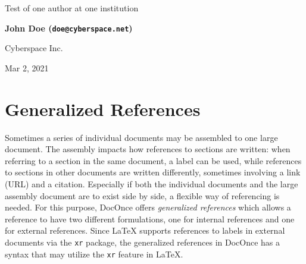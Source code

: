 \documentclass[%
oneside,                 %
final,                   %
chapterprefix=true,      %
open=right,              %
10pt]{book}
\begin{document}

\newcommand{\exercisesection}[1]{\subsection*{#1}}








\thispagestyle{empty}

\begin{center}
{\LARGE\bf
\begin{spacing}{1.25}
Test of one author at one institution
\end{spacing}
}
\end{center}


\begin{center}
{\bf John Doe (\texttt{doe@cyberspace.net})}
\end{center}

    \begin{center}
\centerline{{\small Cyberspace Inc.}}
\end{center}
    

\begin{center}
Mar 2, 2021
\end{center}

\vspace{1cm}



\chapter{Generalized References}
\label{genrefs}

Sometimes a series of individual documents may be assembled to one
large document. The assembly impacts how references to sections
are written: when referring to a section in the same document, a label
can be used, while references to sections in other documents are
written differently, sometimes involving a link (URL) and a citation.
Especially if both the individual documents and the large assembly document
are to exist side by side, a flexible way of referencing is needed.
For this purpose, DocOnce offers \emph{generalized references} which allows
a reference to have two different formulations, one for internal
references and one for external references. Since {\LaTeX} supports
references to labels in external documents via the \texttt{xr} package,
the generalized references in DocOnce has a syntax that may utilize
the \texttt{xr} feature in {\LaTeX}.
\end{document}
